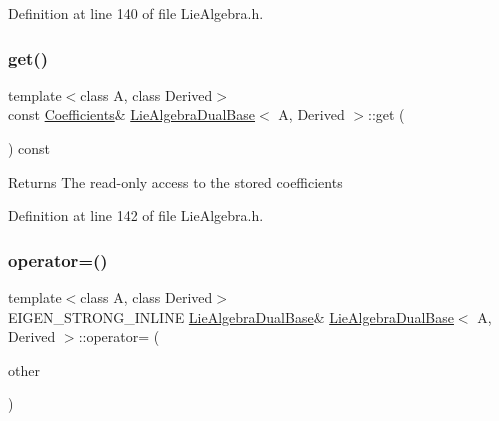 Definition at line 140 of file Lie\+Algebra.\+h.

\hypertarget{class_lie_algebra_dual_base_ae03f2f8180d4da63190a6e2407349695}{}\label{class_lie_algebra_dual_base_ae03f2f8180d4da63190a6e2407349695} 
\subsubsection{\texorpdfstring{get()}{get()}\hspace{0.1cm}{\footnotesize\ttfamily [2/2]}}
{\footnotesize\ttfamily template$<$class A, class Derived$>$ \\
const \hyperlink{class_lie_algebra_dual_base_a9cbdf57fdc61d9ff457e9a9a814f5fdd}{Coefficients}\& \hyperlink{class_lie_algebra_dual_base}{Lie\+Algebra\+Dual\+Base}$<$ A, Derived $>$\+::get (\begin{DoxyParamCaption}{ }\end{DoxyParamCaption}) const\hspace{0.3cm}{\ttfamily [inline]}}

\begin{DoxyReturn}{Returns}
The read-\/only access to the stored coefficients 
\end{DoxyReturn}


Definition at line 142 of file Lie\+Algebra.\+h.

\hypertarget{class_lie_algebra_dual_base_a849c6b62c74363de84a0979ca7ed42ec}{}\label{class_lie_algebra_dual_base_a849c6b62c74363de84a0979ca7ed42ec} 
\subsubsection{\texorpdfstring{operator=()}{operator=()}\hspace{0.1cm}{\footnotesize\ttfamily [1/2]}}
{\footnotesize\ttfamily template$<$class A, class Derived$>$ \\
E\+I\+G\+E\+N\+\_\+\+S\+T\+R\+O\+N\+G\+\_\+\+I\+N\+L\+I\+NE \hyperlink{class_lie_algebra_dual_base}{Lie\+Algebra\+Dual\+Base}\& \hyperlink{class_lie_algebra_dual_base}{Lie\+Algebra\+Dual\+Base}$<$ A, Derived $>$\+::operator= (\begin{DoxyParamCaption}\item[{const \hyperlink{class_lie_algebra_dual_base}{Lie\+Algebra\+Dual\+Base}$<$ A, Derived $>$ \&}]{other }\end{DoxyParamCaption})\hspace{0.3cm}{\ttfamily [inline]}}

